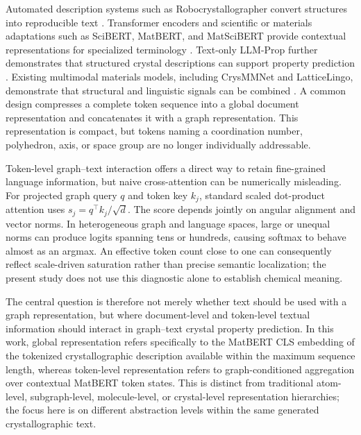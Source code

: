 \documentclass[a4paper,fleqn]{cas-sc}
\begin{document}
Automated description systems such as Robocrystallographer convert structures into reproducible text \citep{ganose2019robocrystallographer}. Transformer encoders \citep{vaswani2017attention,devlin2019bert} and scientific or materials adaptations such as SciBERT, MatBERT, and MatSciBERT provide contextual representations for specialized terminology \citep{beltagy2019scibert,walker2021matbert,gupta2022matscibert}. Text-only LLM-Prop further demonstrates that structured crystal descriptions can support property prediction \citep{rubungo2025llmprop}. Existing multimodal materials models, including CrysMMNet and LatticeLingo, demonstrate that structural and linguistic signals can be combined \citep{das2023crysmmnet,munjal2024latticelingo}. A common design compresses a complete token sequence into a global document representation and concatenates it with a graph representation. This representation is compact, but tokens naming a coordination number, polyhedron, axis, or space group are no longer individually addressable.

Token-level graph--text interaction offers a direct way to retain fine-grained language information, but naive cross-attention can be numerically misleading. For projected graph query $q$ and token key $k_j$, standard scaled dot-product attention uses $s_j=q^\top k_j/\sqrt d$. The score depends jointly on angular alignment and vector norms. In heterogeneous graph and language spaces, large or unequal norms can produce logits spanning tens or hundreds, causing softmax to behave almost as an argmax. An effective token count close to one can consequently reflect scale-driven saturation rather than precise semantic localization; the present study does not use this diagnostic alone to establish chemical meaning.

The central question is therefore not merely whether text should be used with a graph representation, but where document-level and token-level textual information should interact in graph--text crystal property prediction. In this work, global representation refers specifically to the MatBERT CLS embedding of the tokenized crystallographic description available within the maximum sequence length, whereas token-level representation refers to graph-conditioned aggregation over contextual MatBERT token states. This is distinct from traditional atom-level, subgraph-level, molecule-level, or crystal-level representation hierarchies; the focus here is on different abstraction levels within the same generated crystallographic text.
\end{document}
